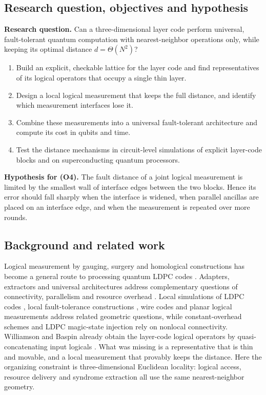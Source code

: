 \documentclass[10pt,a4paper,twocolumn]{article}
\begin{document}
\subsection{Research question, objectives and hypothesis}
\textbf{Research question.} Can a three-dimensional layer code perform
universal, fault-tolerant quantum computation with nearest-neighbor operations
only, while keeping its optimal distance $d=\Theta(N^2)$?

\begin{enumerate}
\item[(O1)] Build an explicit, checkable lattice for the layer code and find
representatives of its logical operators that occupy a single thin layer.
\item[(O2)] Design a local logical measurement that keeps the full distance,
and identify which measurement interfaces lose it.
\item[(O3)] Combine these measurements into a universal fault-tolerant
architecture and compute its cost in qubits and time.
\item[(O4)] Test the distance mechanisms in circuit-level simulations of
explicit layer-code blocks and on superconducting quantum processors.
\end{enumerate}

\noindent\textbf{Hypothesis for (O4).} The fault distance of a joint logical
measurement is limited by the smallest wall of interface edges between the two
blocks.  Hence its error should fall sharply when the interface is widened,
when parallel ancillas are placed on an interface edge, and when the
measurement is repeated over more rounds.

\subsection{Background and related work}
Logical measurement by gauging, surgery and homological constructions has
become a general route to processing quantum LDPC codes
\cite{WilliamsonYoderGauging,CowtanParallelSurgery,YuanParsimonious2026,IdeHomological,BerentLiftedSurgery}.
Adapters, extractors and universal architectures address complementary
questions of connectivity, parallelism and resource overhead
\cite{SwaroopAdapters,HeExtractors,ZhangGoodQLDPC,MalcolmEfficientQLDPC}.
Local simulations of LDPC codes \cite{PattisonHierarchical}, local
fault-tolerance constructions \cite{ChoeKoenigLocal}, wire codes
\cite{BaspinWire} and planar logical measurements \cite{YangPlanar} address
related geometric questions, while constant-overhead schemes
\cite{GottesmanFTThreshold,KovalevPryadko,FawziGrospellierLeverrier} and LDPC
magic-state injection \cite{ZhangInjectionIndependence,LiuInSituInjection} rely
on nonlocal connectivity.  Williamson and Baspin already obtain the layer-code
logical operators by quasi-concatenating input logicals
\cite{WilliamsonBaspinLayerCodes}.  What was missing is a representative that is
thin and movable, and a local measurement that provably keeps the distance.
Here the organizing constraint is three-dimensional Euclidean locality: logical
access, resource delivery and syndrome extraction all use the same
nearest-neighbor geometry.
\end{document}
